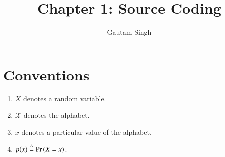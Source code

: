 \documentclass[journal,12pt,twocolumn]{IEEEtran}
\renewcommand\thesection{\arabic{section}}
\begin{document}
\vspace{3cm}
\title{Chapter 1: Source Coding}
\author{Gautam Singh}
\maketitle
\tableofcontents
\bigskip

\section{Conventions}
\begin{enumerate}[label=\thesection.\arabic*, ref=\thesection.\theenumi]
    \item $X$ denotes a random variable.
    \item $\mathcal{X}$ denotes the alphabet.
    \item $x$ denotes a particular value of the alphabet.
    \item $p(x) \stackrel{\triangle}{=} \Pr\left(X = x\right)$.
\end{enumerate}
\end{document}
